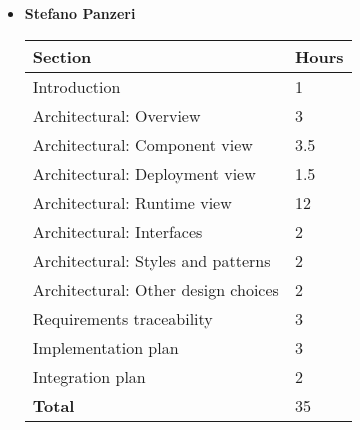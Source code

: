 \begin{itemize}
\item \textbf{Stefano Panzeri}

\begin{table}[!h]
	\centering
	\begin{tabular}{|l|l|}
		\hline
		\textbf{Section}														&		\textbf{Hours}  \\ \hline
		Introduction														&  	1	\\ \hline
		Architectural: Overview						& 		 3	\\ \hline
		Architectural: Component view						& 	3.5	 	\\ \hline
		Architectural: Deployment view						& 	1.5	 	\\ \hline
		Architectural: Runtime view						& 		12 	\\ \hline
		Architectural: Interfaces						& 	2	 	\\ \hline
		Architectural: Styles and patterns					& 	2	 	\\ \hline
		Architectural: Other design choices					& 	2	 	\\ \hline
		Requirements traceability					& 		3 	\\ \hline
		Implementation plan					& 		 3	\\ \hline
		Integration plan					& 		 2	\\ \hline
		\textbf{Total}															& 35	\\ \hline
	\end{tabular}
\end{table}

\end{itemize}
